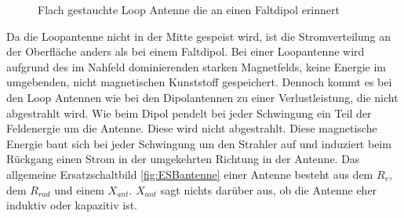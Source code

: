 \begin{figure}[!ht]
	\begin{center}
	\end{center}
\caption{Flach gestauchte Loop Antenne die an einen Faltdipol erinnert}
\label{fig:FflacheLoopAntenne}
\end{figure}
Da  die Loopantenne nicht in der Mitte gespeist wird, ist die Stromverteilung an der Oberfläche anders als bei einem Faltdipol. Bei einer Loopantenne wird aufgrund des im Nahfeld dominierenden starken Magnetfelds, keine Energie im umgebenden, nicht magnetischen  Kunststoff gespeichert. Dennoch kommt es bei den Loop Antennen wie bei den Dipolantennen zu einer Verlustleistung, die nicht abgestrahlt wird. Wie beim Dipol pendelt bei jeder Schwingung ein Teil der Feldenergie um die Antenne. Diese wird nicht abgestrahlt. Diese magnetische Energie baut sich bei jeder Schwingung um den Strahler auf und induziert beim Rückgang einen Strom in der umgekehrten Richtung in der Antenne. Das allgemeine Ersatzschaltbild \ref{fig:ESBantenne} einer Antenne besteht aus dem $R_{v}$, dem $R_{rad}$ und einem $X_{ant}$. $X_{ant}$ sagt nichts darüber aus, ob die Antenne eher induktiv oder kapazitiv ist. 



